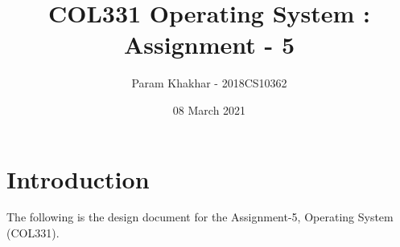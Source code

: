 \documentclass[12pt]{article}
\title{COL331 Operating System : Assignment - 5}
\author{Param Khakhar - 2018CS10362}
\date{08 March 2021}
\begin{document}
\maketitle

\section *{Introduction}

The following is the design document for the Assignment-5, Operating System (COL331).
\end{document}
